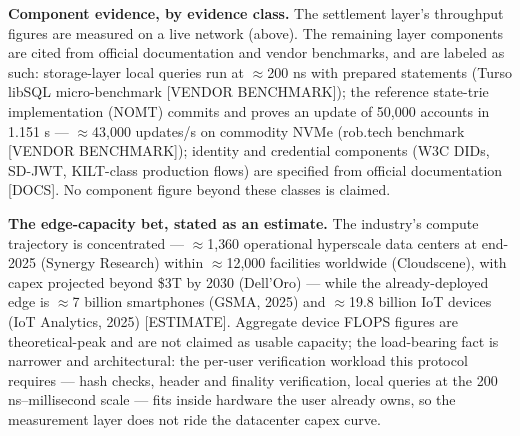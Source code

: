 \documentclass[11pt,twocolumn]{article}
\begin{document}
\textbf{Component evidence, by evidence class.} The settlement layer's throughput figures are measured on a live network (above). The remaining layer components are cited from official documentation and vendor benchmarks, and are labeled as such: storage-layer local queries run at $\approx$200 ns with prepared statements (Turso libSQL micro-benchmark [VENDOR BENCHMARK]); the reference state-trie implementation (NOMT) commits and proves an update of 50{,}000 accounts in 1.151 s --- $\approx$43{,}000 updates/s on commodity NVMe (rob.tech benchmark [VENDOR BENCHMARK]); identity and credential components (W3C DIDs, SD-JWT, KILT-class production flows) are specified from official documentation [DOCS]. No component figure beyond these classes is claimed.

\textbf{The edge-capacity bet, stated as an estimate.} The industry's compute trajectory is concentrated --- $\approx$1{,}360 operational hyperscale data centers at end-2025 (Synergy Research) within $\approx$12{,}000 facilities worldwide (Cloudscene), with capex projected beyond \$3T by 2030 (Dell'Oro) --- while the already-deployed edge is $\approx$7 billion smartphones (GSMA, 2025) and $\approx$19.8 billion IoT devices (IoT Analytics, 2025) [ESTIMATE]. Aggregate device FLOPS figures are theoretical-peak and are not claimed as usable capacity; the load-bearing fact is narrower and architectural: the per-user verification workload this protocol requires --- hash checks, header and finality verification, local queries at the 200 ns--millisecond scale --- fits inside hardware the user already owns, so the measurement layer does not ride the datacenter capex curve.
\end{document}
